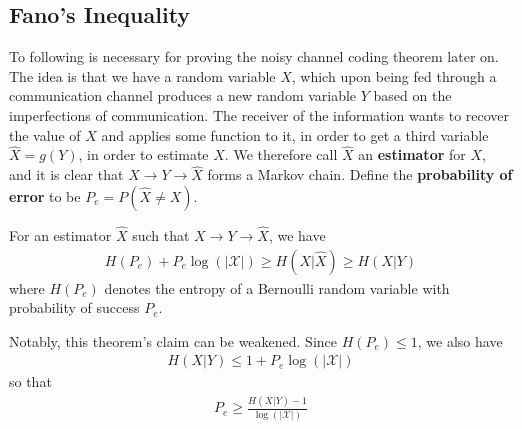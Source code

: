 \subsection{Fano's Inequality}
To following is necessary for proving the noisy channel coding theorem later on. The idea is that we have a random variable $X$, which upon being fed through a communication channel produces a new random variable $Y$ based on the imperfections of communication. The receiver of the information wants to recover the value of $X$ and applies some function to it, in order to get a third variable $\hat{X} = g(Y)$, in order to estimate $X$. We therefore call $\hat{X}$ an \textbf{estimator} for $X$, and it is clear that $X \to Y \to \hat{X}$ forms a Markov chain. Define the \textbf{probability of error} to be $P_e = P(\hat{X} \neq X)$. 
\begin{theorem}
	For an estimator $\hat{X}$ such that $X \to Y \to \hat{X}$, we have 
	\begin{align}
		H(P_e)+P_e\log(|\mathcal{X}|) \geq H(X|\hat{X}) \geq H(X|Y)
	\end{align}
	where $H(P_e)$ denotes the entropy of a Bernoulli random variable with probability of success $P_e$. 
\end{theorem}
Notably, this theorem's claim can be weakened. Since $H(P_e) \leq 1$, we also have
\begin{align}
	H(X|Y) \leq 1+P_e\log(|\mathcal{X}|)
\end{align}
so that
\begin{align}
	P_e \geq \frac{H(X|Y)-1}{\log(|\mathcal{X}|)}
\end{align}

